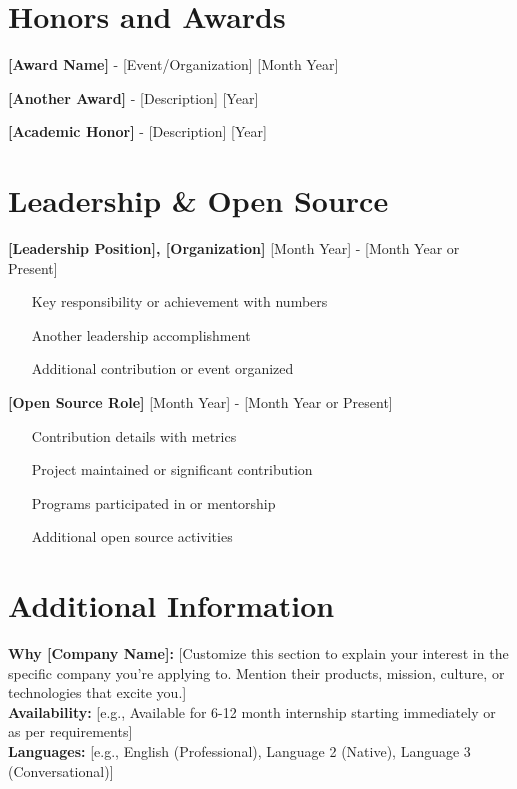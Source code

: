 \documentclass[10pt,letterpaper]{article}
\begin{document}
\section*{Honors and Awards}
\textbf{[Award Name]} - [Event/Organization] \hfill [Month Year] \\
[Brief description of the achievement]

\vspace{0.1cm}

\textbf{[Another Award]} - [Description] \hfill [Year] \\
[Brief context about the achievement]

\vspace{0.1cm}

\textbf{[Academic Honor]} - [Description] \hfill [Year]

\section*{Leadership \& Open Source}
\textbf{[Leadership Position], [Organization]} \hfill [Month Year] - [Month Year or Present] \\
[Institution/Organization Name]
\begin{itemize}[leftmargin=*,label={\color{darkgray}\textbullet},itemsep=1pt]
    \item [Key responsibility or achievement with numbers]
    \item [Another leadership accomplishment]
    \item [Additional contribution or event organized]
\end{itemize}

\vspace{0.2cm}

\textbf{[Open Source Role]} \hfill [Month Year] - [Month Year or Present]
\begin{itemize}[leftmargin=*,label={\color{darkgray}\textbullet},itemsep=1pt]
    \item [Contribution details with metrics]
    \item [Project maintained or significant contribution]
    \item [Programs participated in or mentorship]
    \item [Additional open source activities]
\end{itemize}

\section*{Additional Information}
\textbf{Why [Company Name]:} [Customize this section to explain your interest in the specific company you're applying to. Mention their products, mission, culture, or technologies that excite you.] \\
\textbf{Availability:} [e.g., Available for 6-12 month internship starting immediately or as per requirements] \\
\textbf{Languages:} [e.g., English (Professional), Language 2 (Native), Language 3 (Conversational)]
\end{document}
